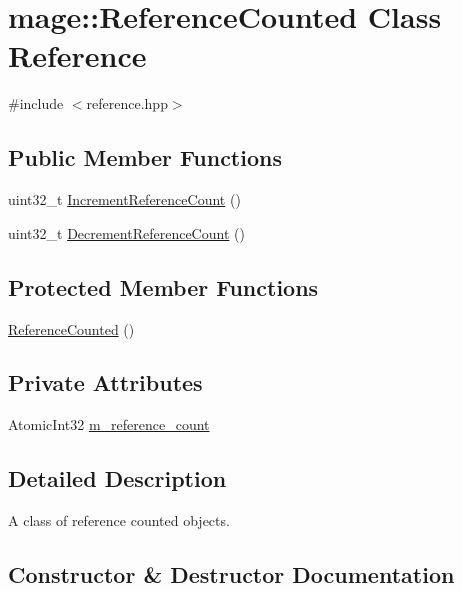 \hypertarget{classmage_1_1_reference_counted}{}\section{mage\+:\+:Reference\+Counted Class Reference}
\label{classmage_1_1_reference_counted}


{\ttfamily \#include $<$reference.\+hpp$>$}

\subsection*{Public Member Functions}
\begin{DoxyCompactItemize}
\item 
uint32\+\_\+t \hyperlink{classmage_1_1_reference_counted_a3d625b492edec2844b4733b82ec5fd3f}{Increment\+Reference\+Count} ()
\item 
uint32\+\_\+t \hyperlink{classmage_1_1_reference_counted_a11304e23189f970ad2f10268b318549f}{Decrement\+Reference\+Count} ()
\end{DoxyCompactItemize}
\subsection*{Protected Member Functions}
\begin{DoxyCompactItemize}
\item 
\hyperlink{classmage_1_1_reference_counted_a3775f5ae578b97eb8cd6c963c077faea}{Reference\+Counted} ()
\end{DoxyCompactItemize}
\subsection*{Private Attributes}
\begin{DoxyCompactItemize}
\item 
Atomic\+Int32 \hyperlink{classmage_1_1_reference_counted_a8ff45f2437be26148d0efcd271adaf45}{m\+\_\+reference\+\_\+count}
\end{DoxyCompactItemize}


\subsection{Detailed Description}
A class of reference counted objects. 

\subsection{Constructor \& Destructor Documentation}
\hypertarget{classmage_1_1_reference_counted_a3775f5ae578b97eb8cd6c963c077faea}{}\label{classmage_1_1_reference_counted_a3775f5ae578b97eb8cd6c963c077faea} 
